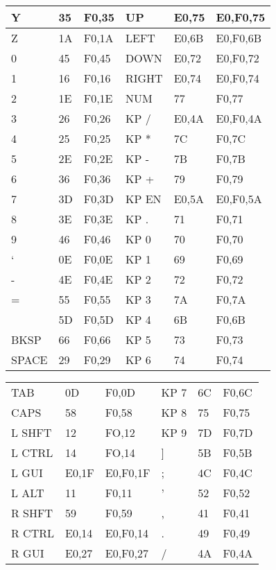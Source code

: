 \begin{center}
\begin{tabular}{ | l | l | l | l | l | l | }
	    Y & 35 & F0,35 & UP & E0,75 & E0,F0,75     \\ \hline
	    Z & 1A & F0,1A & LEFT & E0,6B & E0,F0,6B   \\ \hline
	    0 & 45 & F0,45 & DOWN &  E0,72 & E0,F0,72  \\ \hline
	    1 & 16 & F0,16 & RIGHT &  E0,74 & E0,F0,74 \\ \hline
	    2 & 1E & F0,1E & NUM & 77 & F0,77          \\ \hline
	    3 & 26 & F0,26 & KP / & E0,4A & E0,F0,4A   \\ \hline
	    4 & 25 & F0,25 & KP * & 7C & F0,7C         \\ \hline
	    5 & 2E & F0,2E & KP - & 7B & F0,7B         \\ \hline
	    6 & 36 & F0,36 & KP + & 79 & F0,79         \\ \hline
	    7 & 3D & F0,3D & KP EN & E0,5A & E0,F0,5A  \\ \hline
	    8 & 3E & F0,3E & KP . & 71 & F0,71         \\ \hline
	    9 & 46 & F0,46 & KP 0 & 70 & F0,70         \\ \hline
	    ` & 0E & F0,0E & KP 1 & 69 & F0,69         \\ \hline
	    - & 4E & F0,4E & KP 2 & 72 & F0,72         \\ \hline
	    = & 55 & F0,55 & KP 3 & 7A & F0,7A         \\ \hline
	    \ & 5D & F0,5D & KP 4 & 6B & F0,6B         \\ \hline
	    BKSP &   66 & F0,66 & KP 5 & 73 & F0,73    \\ \hline
	    SPACE &  29 & F0,29 & KP 6 & 74 & F0,74    \\ \hline
  \end{tabular}
\end{center}

\begin{center}
  \begin{tabular}{ | l | l | l | l | l | l | }
    \hline
	    \kword{KEY} & \kword{MAKE} & \kword{BREAK} & \kword{KEY} & \kword{MAKE} & \kword{BREAK} \\ \hline
	    TAB  &   0D & F0,0D & KP 7 & 6C & F0,6C    \\ \hline
	    CAPS  &  58 & F0,58 & KP 8 & 75 & F0,75    \\ \hline
	    L SHFT & 12 & FO,12 & KP 9 & 7D & F0,7D    \\ \hline
	    L CTRL & 14 & FO,14 & ] & 5B & F0,5B       \\ \hline
	    L GUI  & E0,1F & E0,F0,1F & ; & 4C & F0,4C \\ \hline
	    L ALT  & 11 & F0,11 & ' & 52 & F0,52       \\ \hline
	    R SHFT & 59 & F0,59 & , & 41 & F0,41       \\ \hline
	    R CTRL & E0,14 & E0,F0,14 & . & 49 & F0,49 \\ \hline
	    R GUI  & E0,27 & E0,F0,27 & / & 4A & F0,4A \\ \hline
  \end{tabular}
\end{center}

